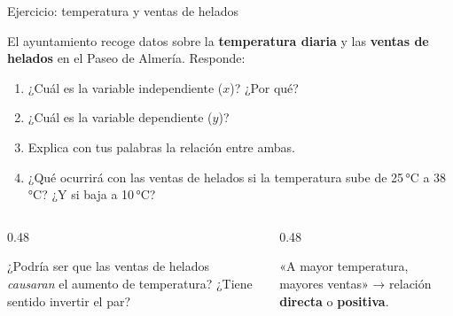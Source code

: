 \documentclass[aspectratio=169, 10pt, spanish]{beamer}
\begin{document}
\begin{frame}{Ejercicio: temperatura y ventas de helados}
  \begin{comprenderbox}
    El ayuntamiento recoge datos sobre la \textbf{temperatura diaria}
    y las \textbf{ventas de helados} en el Paseo de Almería.
    Responde:

    \vspace{0.2cm}
    \begin{enumerate}
      \item ¿Cuál es la variable independiente (\(x\))?
            ¿Por qué?
      \item ¿Cuál es la variable dependiente (\(y\))?
      \item Explica con tus palabras la relación entre ambas.
      \item ¿Qué ocurrirá con las ventas de helados si la temperatura
            sube de 25\,°C a 38\,°C?
            ¿Y si baja a 10\,°C?
    \end{enumerate}
  \end{comprenderbox}

  \vspace{0.3cm}
  \begin{columns}[T]
    \begin{column}{0.48\textwidth}
      \begin{notabox}
        \AlmFontSmall
        ¿Podría ser que las ventas de helados
        \textit{causaran} el aumento de temperatura?
        ¿Tiene sentido invertir el par?
      \end{notabox}
    \end{column}
    \begin{column}{0.48\textwidth}
      \begin{notabox}[Vocabulario]
        \AlmFontSmall
        «A mayor temperatura, mayores ventas» →
        relación \textbf{directa} o \textbf{positiva}.
      \end{notabox}
    \end{column}
  \end{columns}
\end{frame}
\end{document}
